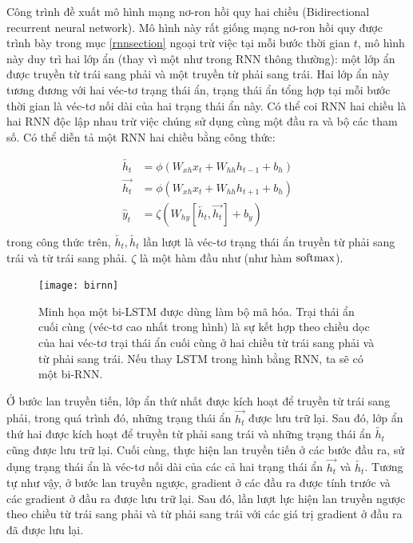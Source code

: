 Công trình \cite{schuster1997} đề xuất mô hình mạng nơ-ron hồi quy hai chiều (Bidirectional recurrent neural network). Mô hình này rất giống mạng nơ-ron hồi quy được trình bày trong mục \ref{rnnsection} ngoại trừ việc tại mỗi bước thời gian $t$, mô hình này duy trì hai lớp ẩn (thay vì một như trong RNN thông thường): một lớp ẩn được truyền từ trái sang phải và một truyền từ phải sang trái. Hai lớp ẩn này tương đương với hai véc-tơ trạng thái ẩn, trạng thái ẩn tổng hợp tại mỗi bước thời gian là véc-tơ nối dài của hai trạng thái ẩn này. Có thể coi RNN hai chiều là hai RNN độc lập nhau trừ việc chúng sử dụng cùng một đầu ra và bộ các tham số. Có thể diễn tả một RNN hai chiều bằng công thức:

\begin{align}
	\overleftarrow{h_t} &= \phi \left(W_{xh} x_{t} + W_{hh} h_{t-1} + b_h \right) \\ \label{birnn1} 
    \overrightarrow{h_t} &= \phi \left(W_{xh} x_{t} + W_{hh} h_{t+1} + b_h \right) \\ \label{birnn2}
    \hat{y}_t &= \zeta \left(W_{hy} \left[\overleftarrow{h_t}, \overrightarrow{h_t} \right] + b_y \right) \\ \label{birnn3}	 \nonumber
\end{align}
trong công thức trên, $\overleftarrow{h_t}, \overleftarrow{h_t}$ lần lượt là véc-tơ trạng thái ẩn truyền từ phải sang trái và từ trái sang phải. $\zeta$ là một hàm đầu như (như hàm $\mathrm{softmax}$).

\begin{figure}
	\centering
	\texttt{[image: birnn]}
	\caption[Minh họa một bi-LSTM được dùng làm bộ mã hóa]{Minh họa một bi-LSTM được dùng làm bộ mã hóa. Trại thái ẩn cuối cùng (véc-tơ cao nhất trong hình) là sự kết hợp theo chiều dọc của hai véc-tơ trại thái ẩn cuối cùng ở hai chiều từ trái sang phải và từ phải sang trái. Nếu thay LSTM trong hình bằng RNN, ta sẽ có một bi-RNN.}
	\label{fig_birnn}
\end{figure}

Ở bước lan truyền tiến, lớp ẩn thứ nhất được kích hoạt để truyền từ trái sang phải, trong quá trình đó, những trạng thái ẩn $\overrightarrow{h_t}$ được lưu trữ lại. Sau đó, lớp ẩn thứ hai được kích hoạt để truyền từ phải sang trái và những trạng thái ẩn $\overleftarrow{h_t}$ cũng được lưu trữ lại. Cuối cùng, thực hiện lan truyền tiến ở các bước đầu ra, sử dụng trạng thái ẩn là véc-tơ nối dài của các cả hai trạng thái ẩn $\overrightarrow{h_t}$ và $\overleftarrow{h_t}$. Tương tự như vậy, ở bước lan truyền ngược, gradient ở các đầu ra được tính trước và các gradient ở đầu ra được lưu trữ lại. Sau đó, lần lượt lực hiện lan truyền ngược theo chiều từ trái sang phải và từ phải sang trái với các giá trị gradient ở đầu ra đã được lưu lại.

